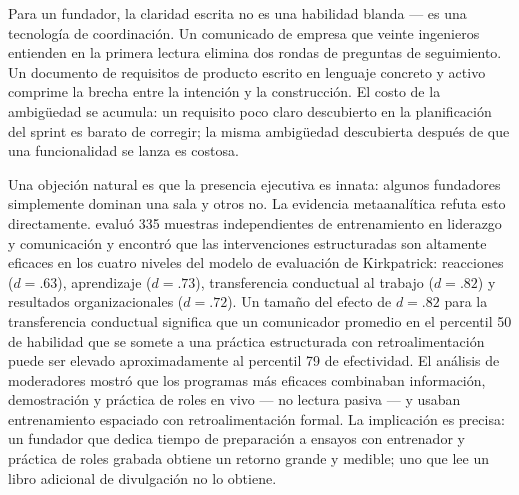Para un fundador, la claridad escrita no es una habilidad blanda — es una tecnología de
coordinación. Un comunicado de empresa que veinte ingenieros entienden en la primera lectura
elimina dos rondas de preguntas de seguimiento. Un documento de requisitos de producto escrito
en lenguaje concreto y activo comprime la brecha entre la intención y la construcción. El
costo de la ambigüedad se acumula: un requisito poco claro descubierto en la planificación del
sprint es barato de corregir; la misma ambigüedad descubierta después de que una funcionalidad
se lanza es costosa.

Una objeción natural es que la presencia ejecutiva es innata: algunos fundadores simplemente
dominan una sala y otros no. La evidencia metaanalítica refuta esto directamente.
\textcite{lacerenza2017training} evaluó 335 muestras independientes de entrenamiento en
liderazgo y comunicación y encontró que las intervenciones estructuradas son altamente eficaces
en los cuatro niveles del modelo de evaluación de Kirkpatrick: reacciones (\(d = .63\)),
aprendizaje (\(d = .73\)), transferencia conductual al trabajo (\(d = .82\)) y resultados
organizacionales (\(d = .72\)). %
Un tamaño del efecto de \(d = .82\) para la transferencia conductual significa que un
comunicador promedio en el percentil 50 de habilidad que se somete a una práctica estructurada
con retroalimentación puede ser elevado aproximadamente al percentil 79 de efectividad. El
análisis de moderadores mostró que los programas más eficaces combinaban información,
demostración y práctica de roles en vivo — no lectura pasiva — y usaban entrenamiento
espaciado con retroalimentación formal. La implicación es precisa: un fundador que dedica
tiempo de preparación a ensayos con entrenador y práctica de roles grabada obtiene un retorno
grande y medible; uno que lee un libro adicional de divulgación no lo obtiene.

